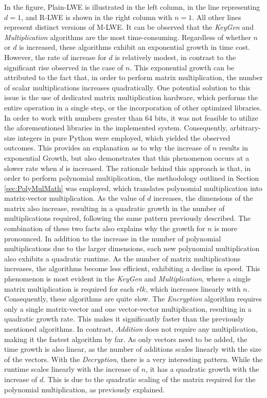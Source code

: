In the figure, Plain-LWE is illustrated in the left column, in the line representing $d=1$, and R-LWE is shown in the right column with $n=1$. All other lines represent distinct versions of M-LWE. It can be observed that the \textit{KeyGen} and \textit{Multiplication} algorithms are the most time-consuming. Regardless of whether $n$ or $d$ is increased, these algorithms exhibit an exponential growth in time cost. However, the rate of increase for $d$ is relatively modest, in contrast to the significant rise observed in the case of $n$. This exponential growth can be attributed to the fact that, in order to perform matrix multiplication, the number of scalar multiplications increases quadratically. One potential solution to this issue is the use of dedicated matrix multiplication hardware, which performs the entire operation in a single step, or the incorporation of other optimized libraries. In order to work with numbers greater than 64 bits, it was not feasible to utilize the aforementioned libraries in the implemented system. Consequently, arbitrary-size integers in pure Python were employed, which yielded the observed outcomes. This provides an explanation as to why the increase of $n$ results in exponential Growth, but also demonstrates that this phenomenon occurs at a slower rate when $d$ is increased. The rationale behind this approach is that, in order to perform polynomial multiplication, the methodology outlined in Section \ref{sec:PolyMulMath} was employed, which translates polynomial multiplication into matrix-vector multiplication. As the value of $d$ increases, the dimensions of the matrix also increase, resulting in a quadratic growth in the number of multiplications required, following the same pattern previously described. The combination of these two facts also explains why the growth for $n$ is more pronounced. In addition to the increase in the number of polynomial multiplications due to the larger dimensions, each new polynomial multiplication also exhibits a quadratic runtime.
As the number of matrix multiplications increases, the algorithms become less efficient, exhibiting a decline in speed. This phenomenon is most evident in the \textit{KeyGen} and \textit{Multiplication}, where a single matrix multiplication is required for each $rlk$, which increases linearly with $n$. Consequently, these algorithms are quite slow. The \textit{Encryption} algorithm requires only a single matrix-vector and one vector-vector multiplication, resulting in a quadratic growth rate. This makes it significantly faster than the previously mentioned algorithms. In contrast, \textit{Addition} does not require any multiplication, making it the fastest algorithm by far. As only vectors need to be added, the time growth is also linear, as the number of additions scales linearly with the size of the vectors. With the \textit{Decryption}, there is a very interesting pattern. While the runtime scales linearly with the increase of $n$, it has a quadratic growth with the increase of $d$. This is due to the quadratic scaling of the matrix required for the polynomial multiplication, as previously explained. 




